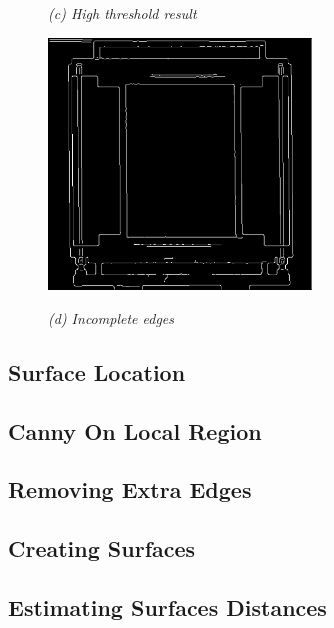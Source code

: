 \begin{figure}[htb]
\begin{minipage}[t]{2.75in}
    \centerline{\emph{(c) High threshold result}}
  \end{minipage}\medskip
  \begin{minipage}[t]{2.75in}
    \centering
    \centerline{\mbox{\includegraphics[width=2.75in]{data_extraction/images/canny/cases/Canny_issue_missing_edges.eps}}}
    \centerline{\emph{(d) Incomplete edges}}
  \end{minipage}

\end{figure}



\subsection{Surface Location}

\subsection{Canny On Local Region}

\subsection{Removing Extra Edges}

\subsection{Creating Surfaces}

\subsection{Estimating Surfaces Distances}


